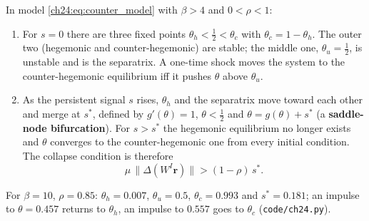 \documentclass[../structural_economics_book.tex]{subfiles}
\begin{document}
\begin{proposition}\label{ch24:thm:counter}
In model \eqref{ch24:eq:counter_model} with $\beta > 4$ and $0 < \rho < 1$:
\begin{enumerate}
\item For $s = 0$ there are three fixed points $\theta_h < \tfrac12 < \theta_c$ with $\theta_c = 1 - \theta_h$. The outer two (hegemonic and counter-hegemonic) are stable; the middle one, $\theta_u = \tfrac12$, is unstable and is the separatrix. A one-time shock moves the system to the counter-hegemonic equilibrium iff it pushes $\theta$ above $\theta_u$.
\item As the persistent signal $s$ rises, $\theta_h$ and the separatrix move toward each other and merge at $s^*$, defined by $g'(\theta) = 1$, $\theta < \tfrac12$ and $\theta = g(\theta) + s^*$ (a \textbf{saddle-node bifurcation}). For $s > s^*$ the hegemonic equilibrium no longer exists and $\theta$ converges to the counter-hegemonic one from every initial condition. The collapse condition is therefore
\begin{equation}\label{ch24:eq:counter_condition}
\mu\,\|\Delta(W^I\mathbf{r})\| > (1-\rho)\,s^*.
\end{equation}
\end{enumerate}
For $\beta = 10$, $\rho = 0.85$: $\theta_h = 0.007$, $\theta_u = 0.5$, $\theta_c = 0.993$ and $s^* = 0.181$; an impulse to $\theta = 0.457$ returns to $\theta_h$, an impulse to $0.557$ goes to $\theta_c$ (\texttt{code/ch24.py}).
\end{proposition}
\end{document}
